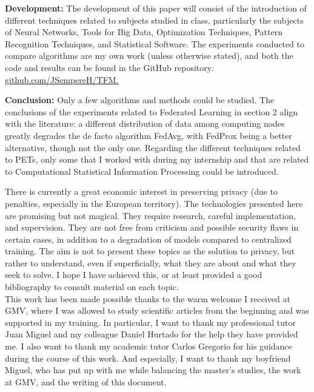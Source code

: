 \documentclass[oneside, openany]{book}
\begin{document}
{\textbf{Development:} The development of this paper will consist of the introduction of different techniques related to subjects studied in class, particularly the subjects of Neural Networks, Tools for Big Data, Optimization Techniques, Pattern Recognition Techniques, and Statistical Software. The experiments conducted to compare algorithms are my own work (unless otherwise stated), and both the code and results can be found in the GitHub repository: \url{github.com/JSempereH/TFM.}

\textbf{Conclusion:} Only a few algorithms and methods could be studied. The conclusions of the experiments related to Federated Learning in section 2 align with the literature: a different distribution of data among computing nodes greatly degrades the de facto algorithm FedAvg, with FedProx being a better alternative, though not the only one. Regarding the different techniques related to PETs, only some that I worked with during my internship and that are related to Computational Statistical Information Processing could be introduced.

There is currently a great economic interest in preserving privacy (due to penalties, especially in the European territory). The technologies presented here are promising but not magical. They require research, careful implementation, and supervision. They are not free from criticism and possible security flaws in certain cases, in addition to a degradation of models compared to centralized training. The aim is not to present these topics as the solution to privacy, but rather to understand, even if superficially, what they are about and what they seek to solve. I hope I have achieved this, or at least provided a good bibliography to consult material on each topic.\\
This work has been made possible thanks to the warm welcome I received at GMV, where I was allowed to study scientific articles from the beginning and was supported in my training. In particular, I want to thank my professional tutor Juan Miguel and my colleague Daniel Hurtado for the help they have provided me. I also want to thank my academic tutor Carlos Gregorio for his guidance during the course of this work. And especially, I want to thank my boyfriend Miguel, who has put up with me while balancing the master’s studies, the work at GMV, and the writing of this document.
}

\normalfont
\tableofcontents





\backmatter


\printbibliography
\end{document}
